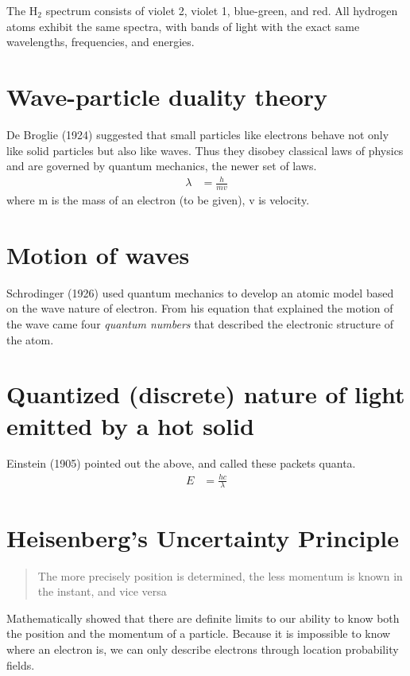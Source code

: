 \documentclass[a4paper, 8pt]{memoir}
\begin{document}
The H$_2$ spectrum consists of violet 2, violet 1, blue-green, and red. All hydrogen atoms exhibit the same spectra, with bands of light with the exact same wavelengths, frequencies, and energies.
\section{Wave-particle duality theory}
De Broglie (1924) suggested that small particles like electrons behave not only like solid particles but also like waves. Thus they disobey classical laws of physics and are governed by quantum mechanics, the newer set of laws.
\begin{align}
\lambda &= \frac{h}{mv} 
\end{align}
where m is the mass of an electron (to be given), v is velocity.
\section{Motion of waves}
Schrodinger (1926) used quantum mechanics to develop an atomic model based on the wave nature of electron. From his equation that explained the motion of the wave came four \emph{quantum numbers} that described the electronic structure of the atom.
\section{Quantized (discrete) nature of light emitted by a hot solid}
Einstein (1905) pointed out the above, and called these packets quanta.
\begin{align}
E &= \frac{hc}{\lambda}
\end{align}
\section{Heisenberg's Uncertainty Principle}
\begin{quote}
The more precisely position is determined, the less momentum is known in the instant, and vice versa
\end{quote}
Mathematically showed that there are definite limits to our ability to know both the position and the momentum of a particle. Because it is impossible to know where an electron is, we can only describe electrons through location probability fields.
\end{document}
